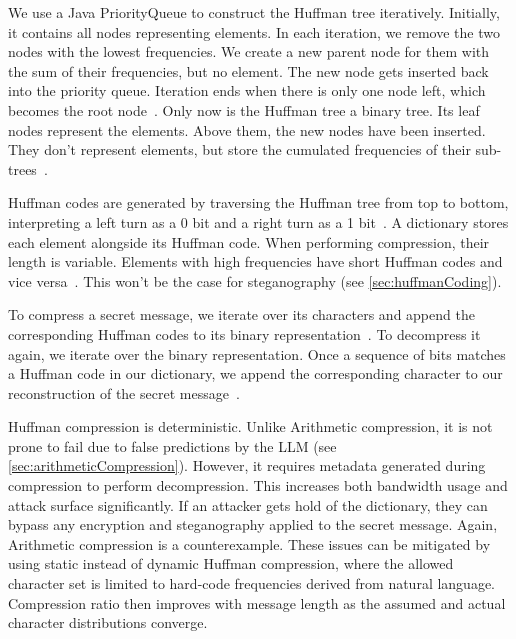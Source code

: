 We use a Java PriorityQueue to construct the Huffman tree iteratively. Initially, it contains all nodes representing elements. In each iteration, we remove the two nodes with the lowest frequencies. We create a new parent node for them with the sum of their frequencies, but no element. The new node gets inserted back into the priority queue. Iteration ends when there is only one node left, which becomes the root node~\cite{huffmanMethodConstructionMinimumRedundancy1952}. Only now is the Huffman tree a binary tree. Its leaf nodes represent the elements. Above them, the new nodes have been inserted. They don't represent elements, but store the cumulated frequencies of their sub-trees~\cite{huffmanMethodConstructionMinimumRedundancy1952}.

Huffman codes are generated by traversing the Huffman tree from top to bottom, interpreting a left turn as a 0 bit and a right turn as a 1 bit~\cite{huffmanMethodConstructionMinimumRedundancy1952}. A dictionary stores each element alongside its Huffman code. When performing compression, their length is variable. Elements with high frequencies have short Huffman codes and vice versa~\cite{huffmanMethodConstructionMinimumRedundancy1952}. This won't be the case for steganography (see \cref{sec:huffmanCoding}).

To compress a secret message, we iterate over its characters and append the corresponding Huffman codes to its binary representation~\cite{huffmanMethodConstructionMinimumRedundancy1952}. To decompress it again, we iterate over the binary representation. Once a sequence of bits matches a Huffman code in our dictionary, we append the corresponding character to our reconstruction of the secret message~\cite{huffmanMethodConstructionMinimumRedundancy1952}.

Huffman compression is deterministic. Unlike Arithmetic compression, it is not prone to fail due to false predictions by the \gls{LLM} (see \cref{sec:arithmeticCompression}). However, it requires metadata generated during compression to perform decompression. This increases both bandwidth usage and attack surface significantly. If an attacker gets hold of the dictionary, they can bypass any encryption and steganography applied to the secret message. Again, Arithmetic compression is a counterexample. These issues can be mitigated by using static instead of dynamic Huffman compression, where the allowed character set is limited to hard-code frequencies derived from natural language. Compression ratio then improves with message length as the assumed and actual character distributions converge.

